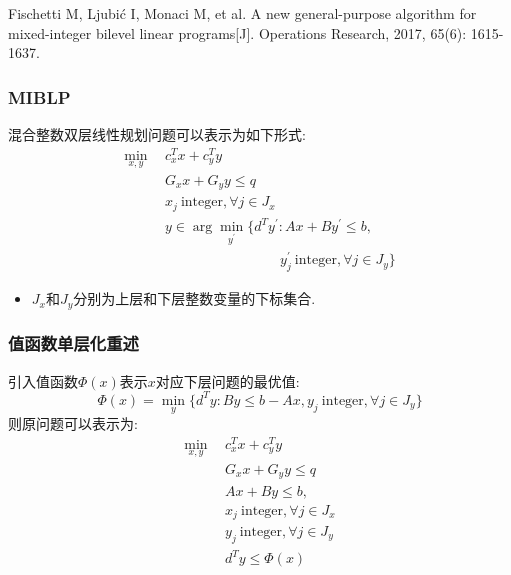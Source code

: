 \documentclass[10pt]{beamer}
\begin{document}
\begin{frame}
	Fischetti M, Ljubić I, Monaci M, et al. A new general-purpose algorithm for mixed-integer bilevel linear programs[J]. Operations Research, 2017, 65(6): 1615-1637.
\end{frame}

\begin{frame}
	\frametitle{MIBLP}
	混合整数双层线性规划问题可以表示为如下形式:
	\begin{equation}
		\begin{aligned}
			\min_{x,y}~~&c_{x}^{T}x+c_{y}^{T}y \\
			&G_xx+G_yy \leq q  \\
			&x_{j}\mathrm{~integer}, \forall j\in J_{x}  \\
			&y\in\operatorname{arg}\operatorname*{min}_{y^{\prime}}\{d^{T}y^{\prime}:Ax+By^{\prime}\le b,\\
			&\qquad\qquad\qquad\qquad~ y_{j}^{\prime}\mathrm{~integer}, \forall j\in J_{y}\}
		\end{aligned}
	\end{equation}
	\begin{itemize}
		\item $J_x$和$J_y$分别为上层和下层整数变量的下标集合.
	\end{itemize}


\end{frame}

\begin{frame}
	\frametitle{值函数单层化重述}
	引入值函数$\Phi(x)$表示$x$对应下层问题的最优值:
	\begin{equation}
		\Phi(x)=\operatorname*{min}_{y}\{d^{T}y:By\le b-Ax,y_{j}\mathrm{~integer}, \forall j\in J_{y}\}
	\end{equation}
	则原问题可以表示为:
	\begin{subequations}
		\begin{align}
			\min_{x,y}~~&c_{x}^{T}x+c_{y}^{T}y \\
			&G_xx+G_yy \leq q  \\
			&Ax+By\leq b,\\
			&x_{j}\mathrm{~integer}, \forall j\in J_{x}  \\
			&y_{j}\mathrm{~integer}, \forall j\in J_{y}  \\
			&d^{T}y\leq \Phi(x)	\label{lower constraint}
		\end{align}
	\end{subequations}

\end{frame}
\end{document}
